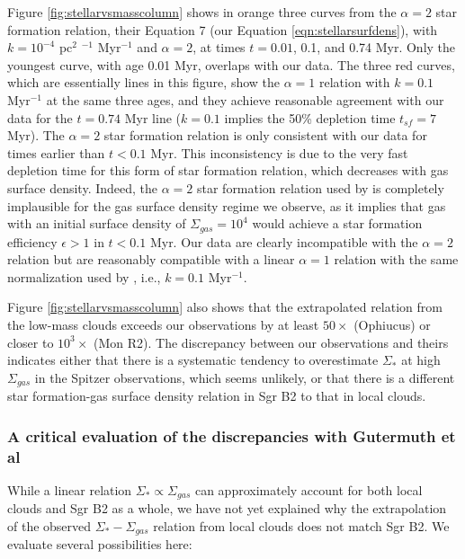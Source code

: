 \documentclass[twocolumn]{aastex61}
\begin{document}
Figure \ref{fig:stellarvsmasscolumn}  shows in orange three curves from the
\citet{Gutermuth2011a} $\alpha=2$ star formation relation, their Equation 7
(our Equation \ref{eqn:stellarsurfdens}),
with $k=10^{-4}$ pc$^{2}$ \msun$^{-1}$ Myr$^{-1}$ and $\alpha=2$, at times
$t=0.01$, 0.1, and 0.74 Myr.  Only the youngest curve, with age 0.01 Myr,
overlaps with our data.  The three red curves, which are essentially lines in
this figure, show the $\alpha=1$ relation with $k=0.1$ Myr$^{-1}$ at the same
three ages, and they achieve reasonable agreement with our data for the $t=0.74$
Myr line ($k=0.1$ \permyr implies the 50\% depletion time $t_{sf}=7$ Myr).  The
$\alpha=2$ star formation relation  is only consistent with our
data for times earlier than $t<0.1$ Myr.  This inconsistency is due to the very
fast depletion time for this form of star formation relation, which decreases
with gas surface density.  Indeed, the $\alpha=2$ star formation relation used
by \citet{Gutermuth2011a} is completely implausible for the gas surface density
regime we observe, as it implies that gas with an initial surface density of
$\Sigma_{gas}=10^4$ \msun \perspc would achieve a star formation efficiency
$\epsilon>1$ in $t<0.1$ Myr.  Our data are clearly incompatible with the
$\alpha=2$ relation but are reasonably compatible with a linear $\alpha=1$
relation with the same normalization used by \citet{Gutermuth2011a}, i.e.,
$k=0.1$ Myr$^{-1}$.



Figure \ref{fig:stellarvsmasscolumn} also shows that the extrapolated relation
from the low-mass clouds exceeds our observations by at least $50\times$
(Ophiucus) or closer to $10^3\times$ (Mon R2).   The discrepancy between our
observations and theirs indicates either that there is a systematic tendency to
overestimate $\Sigma_*$ at high $\Sigma_{gas}$ in the Spitzer observations,
which seems unlikely, or that there is a different star formation-gas surface
density relation in Sgr B2 to that in local clouds.


\subsubsection{A critical evaluation of the discrepancies with Gutermuth et al}
\label{sec:gutermuthdiscrepancy}
While a linear relation $\Sigma_* \propto \Sigma_{gas}$ can approximately
account for both local clouds and Sgr B2 as a whole, we have not yet explained
why the extrapolation of the observed $\Sigma_* - \Sigma_{gas}$ relation from
local clouds does not match Sgr B2.  We evaluate several possibilities here:
\end{document}
